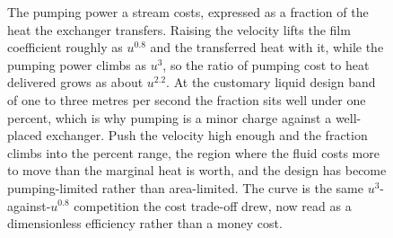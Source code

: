 \begin{figure}[htbp]
\centering
{}
\caption[Pumping power as a fraction of the heat duty]{The pumping power a stream
costs, expressed as a fraction of the heat the exchanger transfers. Raising the
velocity lifts the film coefficient roughly as $u^{0.8}$ and the transferred
heat with it, while the pumping power climbs as $u^3$, so the ratio of pumping
cost to heat delivered grows as about $u^{2.2}$. At the customary liquid design
band of one to three metres per second the fraction sits well under one percent,
which is why pumping is a minor charge against a well-placed exchanger. Push the
velocity high enough and the fraction climbs into the percent range, the region
where the fluid costs more to move than the marginal heat is worth, and the
design has become pumping-limited rather than area-limited. The curve is the same
$u^3$-against-$u^{0.8}$ competition the cost trade-off drew, now read as a
dimensionless efficiency rather than a money cost.}
\label{fig:vol04ch06:pumping-fraction}
\end{figure}
